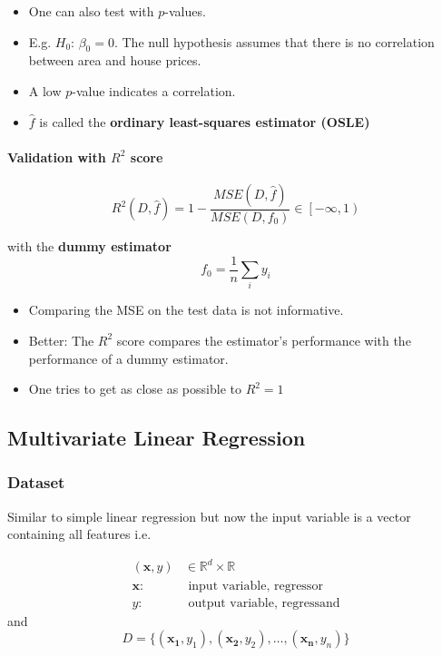 
\begin{itemize}
    \item One can also test with $p$-values.
    \item E.g. $H_0$: $\beta_0=0$. The null hypothesis assumes that there is no correlation between area and house prices.
    \item A low $p$-value indicates a correlation.
\end{itemize}


\begin{itemize}
    \item $\hat{f}$ is called the \textbf{ordinary least-squares estimator (OSLE)}
\end{itemize}

\paragraph[Validation with R2]{Validation with $R^2$ score}
\begin{equation*}
    R^2(D,\hat{f})=1-\frac{MSE(D,\hat{f})}{MSE(D,f_0)}\in\left[-\infty,1\right) %
\end{equation*}

with the \textbf{dummy estimator}
\begin{equation*}
    f_0=\frac1n\sum_{i}{y_i}
\end{equation*}


\begin{itemize}
    \item Comparing the MSE on the test data is not informative.
    \item Better: The $R^2$ score compares the estimator's performance with the performance of a dummy estimator.
    \item One tries to get as close as possible to $R^2=1$
\end{itemize}

\subsection{Multivariate Linear Regression}
\subsubsection{Dataset}
Similar to simple linear regression but now the input variable is a vector containing all features i.e.

\begin{align*}
    (\mathbf{x},y) & \in\mathbb{R}^d\times\mathbb{R}     \\
    \mathbf{x}:    & \text{ input variable, regressor}   \\
    y:             & \text{ output variable, regressand}
\end{align*}
and
\begin{equation*}
    D=\{(\mathbf{x_1},y_1),(\mathbf{x_2},y_2),\dots,(\mathbf{x_n},y_n)\}
\end{equation*}

